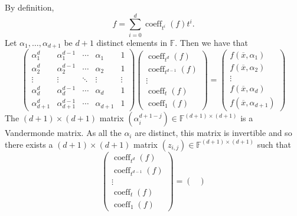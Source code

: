\documentclass[10pt,a4paper]{amsart}
\DeclareMathOperator{\coeff}{coeff}
\newcommand*\F{\mathbb{F}}
\begin{document}
\begin{pf}
    By definition,
    \[
        f = \sum_{i = 0}^d \coeff_{t^i}(f) t^i.
    \]
    Let $\alpha_1, \ldots, \alpha_{d + 1}$ be $d + 1$ distinct elements in $\F$.
    Then we have that 
    \[
        \begin{pmatrix}
            \alpha_1^d & \alpha_1^{d - 1} & \cdots & \alpha_1 & 1 \\ 
            \alpha_2^d & \alpha_2^{d - 1} & \cdots & \alpha_2 & 1 \\ 
            \vdots & \vdots & \ddots & \vdots & \vdots \\
            \alpha_{d}^d & \alpha_{d}^{d - 1} & \cdots & \alpha_{d} & 1 \\ 
            \alpha_{d + 1}^d & \alpha_{d + 1}^{d - 1} & \cdots & \alpha_{d + 1} & 1 
        \end{pmatrix}
        \begin{pmatrix}
            \coeff_{t^d}(f) \\
            \coeff_{t^{d-1}}(f) \\
            \vdots \\
            \coeff_{t}(f) \\
            \coeff_{1}(f)
        \end{pmatrix}
        =
        \begin{pmatrix}
            f(\overline{x},\alpha_1) \\
            f(\overline{x},\alpha_2) \\
            \vdots \\
            f(\overline{x},\alpha_d) \\
            f(\overline{x},\alpha_{d+1})
        \end{pmatrix}        
    \]
    The $(d + 1) \times (d + 1)$ matrix $(\alpha_i^{d + 1 - j}) \in \F^{(d + 1) \times (d + 1)}$ is a Vandermonde matrix.
    As all the $\alpha_i$ are distinct, this matrix is invertible and so there exists a $(d + 1) \times (d + 1)$ matrix $(z_{i, j}) \in \F^{(d + 1) \times (d + 1)}$ such that
    \[
        \begin{pmatrix}
            \coeff_{t^d}(f) \\
            \coeff_{t^{d-1}}(f) \\
            \vdots \\
            \coeff_{t}(f) \\
            \coeff_{1}(f)
        \end{pmatrix}
        =
        \begin{pmatrix}

\end{pmatrix}\]
\end{pf}
\end{document}
